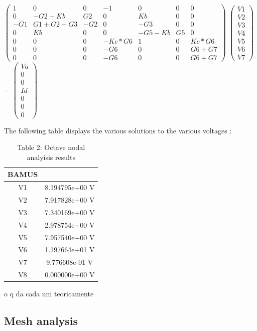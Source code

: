 $\begin{pmatrix}
1 & 0 & 0 & -1 & 0 & 0 & 0 \\
0 & -G2-Kb & G2 & 0 & Kb & 0 & 0 \\
-G1 & G1+G2+G3 & -G2 & 0 & -G3 & 0 & 0 \\
0 & Kb & 0 & 0 & -G5-Kb & G5 & 0 \\
0 & 0 & 0 & -Kc*G6 & 1 & 0 & Kc*G6 \\
0 & 0 & 0 & -G6 & 0 & 0 & G6+G7 \\
0 & 0 & 0 & -G6 & 0 & 0 & G6+G7 
\end{pmatrix}$
$\begin{pmatrix}
V1\\
V2\\
V3\\
V4\\
V5\\
V6\\
V7
\end{pmatrix}$
=
$\begin{pmatrix}
Va\\
0\\
0\\
Id\\
0\\
0\\
0
\end{pmatrix}$


The following table displays the various solutions to the various voltages :

\begin{table}[h]
\centering
\begin{tabular}{c|c} 
 \hline
 BAMUS\\ [0.5ex] 
 \hline\hline
V1 & 8.194795e+00 V\\ \hline
V2 & 7.917828e+00 V\\ \hline
V3 & 7.340169e+00 V\\ \hline
V4 & 2.978754e+00 V\\ \hline
V5 & 7.957540e+00 V\\ \hline
V6 & 1.197664e+01 V\\ \hline
V7 & 9.776608e-01 V\\ \hline
V8 & 0.000000e+00 V\\ \hline 
\end{tabular}
\caption{Table 2: Octave nodal analyisis results}
\label{table:2}
\end{table}

o q da cada um teoricamente

\subsection{Mesh analysis}


